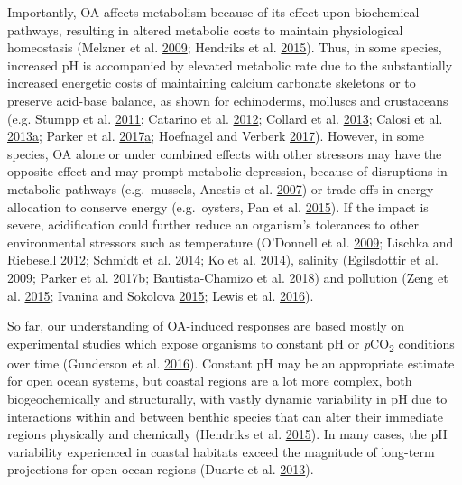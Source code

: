 \documentclass[a4paper,10pt, oneside]{memoir}
\begin{document}
Importantly, OA affects metabolism because of its effect upon biochemical pathways, resulting in altered metabolic costs to maintain physiological homeostasis (Melzner et al. \protect\hyperlink{ref-Melzner2009}{2009}; Hendriks et al. \protect\hyperlink{ref-Hendriks2015}{2015}).
Thus, in some species, increased pH is accompanied by elevated metabolic rate due to the substantially increased energetic costs of maintaining calcium carbonate skeletons or to preserve acid-base balance, as shown for echinoderms, molluscs and crustaceans (e.g. Stumpp et al. \protect\hyperlink{ref-Stumpp2011}{2011}; Catarino et al. \protect\hyperlink{ref-Catarino2012}{2012}; Collard et al. \protect\hyperlink{ref-Collard2013}{2013}; Calosi et al. \protect\hyperlink{ref-Calosi2013}{2013}\protect\hyperlink{ref-Calosi2013}{a}; Parker et al. \protect\hyperlink{ref-Parker2017}{2017}\protect\hyperlink{ref-Parker2017}{a}; Hoefnagel and Verberk \protect\hyperlink{ref-Hoefnagel2017}{2017}).
However, in some species, OA alone or under combined effects with other stressors may have the opposite effect and may prompt metabolic depression, because of disruptions in metabolic pathways (e.g.~mussels, Anestis et al. \protect\hyperlink{ref-Anestis2007}{2007}) or trade-offs in energy allocation to conserve energy (e.g.~oysters, Pan et al. \protect\hyperlink{ref-Pan2015}{2015}).
If the impact is severe, acidification could further reduce an organism's tolerances to other environmental stressors such as temperature (O'Donnell et al. \protect\hyperlink{ref-ODonnell2009}{2009}; Lischka and Riebesell \protect\hyperlink{ref-Lischka2012}{2012}; Schmidt et al. \protect\hyperlink{ref-Schmidt2014}{2014}; Ko et al. \protect\hyperlink{ref-Ko2014}{2014}), salinity (Egilsdottir et al. \protect\hyperlink{ref-Egilsdottir2009}{2009}; Parker et al. \protect\hyperlink{ref-Parker2017a}{2017}\protect\hyperlink{ref-Parker2017a}{b}; Bautista-Chamizo et al. \protect\hyperlink{ref-Bautista-Chamizo2018}{2018}) and pollution (Zeng et al. \protect\hyperlink{ref-Zeng2015}{2015}; Ivanina and Sokolova \protect\hyperlink{ref-Ivanina2015}{2015}; Lewis et al. \protect\hyperlink{ref-Lewis2016}{2016}).

So far, our understanding of OA-induced responses are based mostly on experimental studies which expose organisms to constant pH or \emph{p}CO\textsubscript{2} conditions over time (Gunderson et al. \protect\hyperlink{ref-Gunderson2016}{2016}).
Constant pH may be an appropriate estimate for open ocean systems, but coastal regions are a lot more complex, both biogeochemically and structurally, with vastly dynamic variability in pH due to interactions within and between benthic species that can alter their immediate regions physically and chemically (Hendriks et al. \protect\hyperlink{ref-Hendriks2015}{2015}).
In many cases, the pH variability experienced in coastal habitats exceed the magnitude of long-term projections for open-ocean regions (Duarte et al. \protect\hyperlink{ref-Duarte2013}{2013}).
\end{document}

